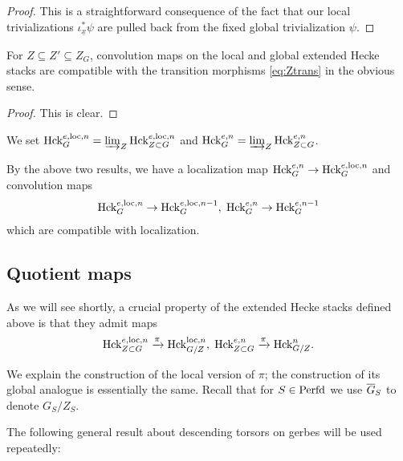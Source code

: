 \begin{proof}
    This is a straightforward consequence of the fact that our local trivializations $\iota_{\underline{x}}^{*}\psi$ are pulled back from the fixed global trivialization $\psi$.
\end{proof}

\begin{lem}\label{lem:changeinZconv}
   For $Z \subseteq Z' \subseteq Z_{G}$, convolution maps on the local and global extended Hecke stacks are compatible with the transition morphisms \eqref{eq:Ztrans} in the obvious sense.
\end{lem}

\begin{proof}
This is clear.
\end{proof}

\begin{defi}
    We set $\textnormal{Hck}_{G}^{e,\mathrm{loc},n} = \varinjlim_{Z} \textnormal{Hck}_{Z \subset G}^{e,\mathrm{loc},n}$ and $\textnormal{Hck}_{G}^{e,n} = \varinjlim_{Z} \textnormal{Hck}_{Z \subset G}^{e,n}$. 
\end{defi}

By the above two results, we have a localization map $\textnormal{Hck}_{G}^{e,n} \to \textnormal{Hck}_{G}^{e,\mathrm{loc},n} $ and convolution maps
    \begin{equation*}
 \textnormal{Hck}_{G}^{e,\mathrm{loc},n} \to  \textnormal{Hck}_{G}^{e,\mathrm{loc},n-1},  \hspace{1mm} \textnormal{Hck}_{G}^{e,n} \to  \textnormal{Hck}_{G}^{e,n-1}
    \end{equation*}
    which are compatible with localization.



\subsection{Quotient maps}\label{sec:quotmap}
As we will see shortly, a crucial property of the extended Hecke stacks defined above is that they admit maps 
\begin{equation*}
\textnormal{Hck}^{e,\mathrm{loc},n}_{Z \subset G} \xrightarrow{\pi} \textnormal{Hck}^{\mathrm{loc},n}_{G/Z}, \hspace{1mm} \textnormal{Hck}^{e,n}_{Z \subset G} \xrightarrow{\pi} \textnormal{Hck}^{n}_{G/Z}.
\end{equation*}

We explain the construction of the local version of $\pi$; the construction of its global analogue is essentially the same. Recall that for $S \in \mathrm{Perfd}$ we use $\overline{G}_{S}$ to denote $G_{S}/Z_{S}$.

The following general result about descending torsors on gerbes will be used repeatedly:

